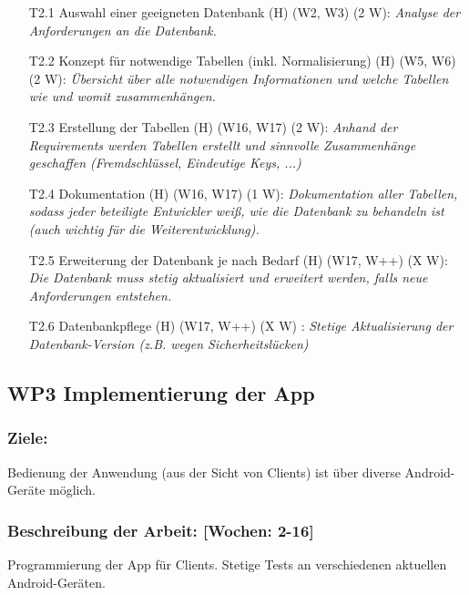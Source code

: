 \documentclass{scrreprt}
\begin{document}
\begin{enumerate}
\item [T2.1] Auswahl einer geeigneten Datenbank (H) (W2, W3) (2 W): \emph{ Analyse der Anforderungen an die Datenbank.}
\item [T2.2] Konzept für notwendige Tabellen (inkl. Normalisierung) (H) (W5, W6) (2 W): \emph{ Übersicht über alle notwendigen Informationen und welche Tabellen wie und womit zusammenhängen.}
\item [T2.3] Erstellung der Tabellen (H) (W16, W17) (2 W): \emph{ Anhand der Requirements werden Tabellen erstellt und sinnvolle Zusammenhänge geschaffen (Fremdschlüssel, Eindeutige Keys, ...)}
\item [T2.4] Dokumentation (H) (W16, W17) (1 W): \emph{ Dokumentation aller Tabellen, sodass jeder beteiligte Entwickler weiß, wie die Datenbank zu behandeln ist (auch wichtig für die Weiterentwicklung).}
\item [T2.5] Erweiterung der Datenbank je nach Bedarf (H) (W17, W++) (X W): \emph{ Die Datenbank muss stetig aktualisiert und erweitert werden, falls neue Anforderungen entstehen.}
\item [T2.6] Datenbankpflege (H) (W17, W++) (X W) : \emph{ Stetige Aktualisierung der Datenbank-Version (z.B. wegen Sicherheitslücken)}
\end{enumerate}

\subsection*{WP3 Implementierung der App}

\subsubsection{Ziele:} Bedienung der Anwendung (aus der Sicht von Clients) ist über diverse Android-Geräte möglich.
\subsubsection{Beschreibung der Arbeit: [Wochen: 2-16]} Programmierung der App für Clients. Stetige Tests an verschiedenen aktuellen Android-Geräten.
\end{document}
